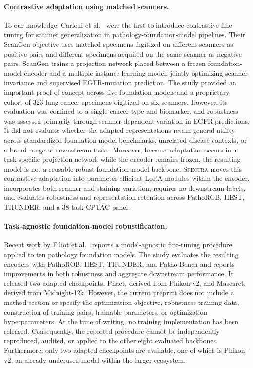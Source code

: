 \documentclass{article}
\begin{document}
\paragraph{Contrastive adaptation using matched scanners.}
To our knowledge, Carloni et al.\ \citep{carloni2025scangen} were the first to introduce contrastive fine-tuning for scanner generalization in pathology-foundation-model pipelines. Their ScanGen objective uses matched specimens digitized on different scanners as positive pairs and different specimens acquired on the same scanner as negative pairs. ScanGen trains a projection network placed between a frozen foundation-model encoder and a multiple-instance learning model, jointly optimizing scanner invariance and supervised EGFR-mutation prediction. The study provided an important proof of concept across five foundation models and a proprietary cohort of 323 lung-cancer specimens digitized on six scanners. However, its evaluation was confined to a single cancer type and biomarker, and robustness was assessed primarily through scanner-dependent variation in EGFR predictions. It did not evaluate whether the adapted representations retain general utility across standardized foundation-model benchmarks, unrelated disease contexts, or a broad range of downstream tasks. Moreover, because adaptation occurs in a task-specific projection network while the encoder remains frozen, the resulting model is not a reusable robust foundation-model backbone. \textsc{Spectra} moves this contrastive adaptation into parameter-efficient LoRA modules within the encoder, incorporates both scanner and staining variation, requires no downstream labels, and evaluates robustness and representation retention across PathoROB, HEST, THUNDER, and a 38-task CPTAC panel.

\paragraph{Task-agnostic foundation-model robustification.}
Recent work by Filiot et al.\ \citep{filiot2026robustifying} reports a model-agnostic fine-tuning procedure applied to ten pathology foundation models. The study evaluates the resulting encoders with PathoROB, HEST, THUNDER, and Patho-Bench and reports improvements in both robustness and aggregate downstream performance. It released two adapted checkpoints: Phaet, derived from Phikon-v2, and Mascaret, derived from Midnight-12k. However, the current preprint does not include a method section or specify the optimization objective, robustness-training data, construction of training pairs, trainable parameters, or optimization hyperparameters. At the time of writing, no training implementation has been released. Consequently, the reported procedure cannot be independently reproduced, audited, or applied to the other eight evaluated backbones. Furthermore, only two adapted checkpoints are available, one of which is Phikon-v2, an already underused model within the larger ecosystem.
\end{document}
